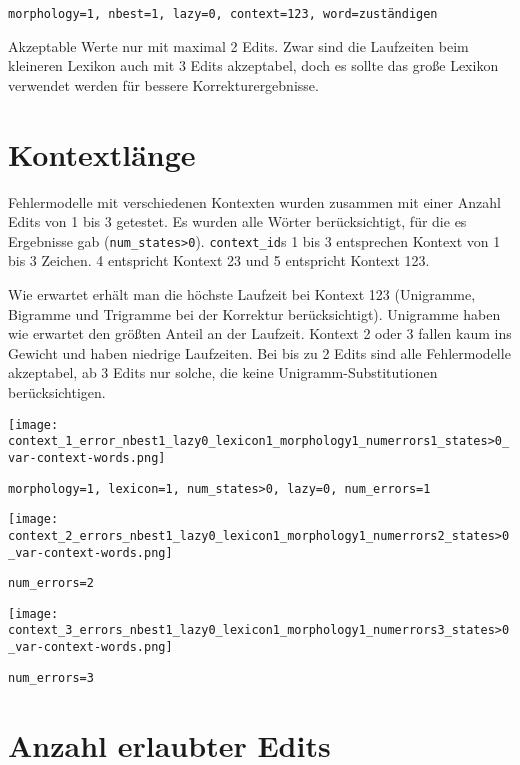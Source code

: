 \documentclass[12pt]{article}
\begin{document}
\verb+morphology=1, nbest=1, lazy=0, context=123, word=zuständigen+


Akzeptable Werte nur mit maximal 2 Edits.
Zwar sind die Laufzeiten beim kleineren Lexikon auch mit 3 Edits
akzeptabel, doch es sollte das große Lexikon verwendet werden für bessere
Korrekturergebnisse.


\section{Kontextlänge}

Fehlermodelle mit verschiedenen Kontexten wurden
zusammen mit einer Anzahl Edits von 1 bis 3 getestet.
Es wurden alle Wörter berücksichtigt, für die es Ergebnisse gab
(\verb+num_states>0+).
\verb+context_id+s 1 bis 3 entsprechen Kontext von 1 bis 3 Zeichen. 4
entspricht Kontext 23 und 5 entspricht Kontext 123.


Wie erwartet erhält man die höchste Laufzeit bei Kontext 123 (Unigramme, Bigramme und
Trigramme bei der Korrektur berücksichtigt).
Unigramme haben wie erwartet den größten Anteil an der Laufzeit.
Kontext 2 oder 3 fallen kaum ins Gewicht und haben niedrige Laufzeiten.
Bei bis zu 2 Edits sind alle Fehlermodelle akzeptabel, ab 3 Edits nur solche, die
keine Unigramm-Substitutionen berücksichtigen.

\newpage


\texttt{[image: context\_1\_error\_nbest1\_lazy0\_lexicon1\_morphology1\_numerrors1\_states>0\_var-context-words.png]}

\verb+morphology=1, lexicon=1, num_states>0, lazy=0, num_errors=1+

\texttt{[image: context\_2\_errors\_nbest1\_lazy0\_lexicon1\_morphology1\_numerrors2\_states>0\_var-context-words.png]}

\verb+num_errors=2+

\texttt{[image: context\_3\_errors\_nbest1\_lazy0\_lexicon1\_morphology1\_numerrors3\_states>0\_var-context-words.png]}

\verb+num_errors=3+



\section{Anzahl erlaubter Edits}

\end{document}
